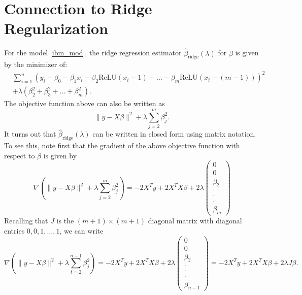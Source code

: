 \documentclass{scrartcl}
\newcommand{\relu}{{\text{ReLU}}}
\newcommand{\ridge}{{\hat{\beta}_{\text{ridge}}(\lambda)}}
\begin{document}
\section{Connection to Ridge Regularization}
For the model \eqref{ibm_mod}, the ridge regression estimator $\ridge$
for $\beta$ is given by the minimizer of: 
\begin{equation}\label{ridge_est}
  \begin{split}
 & \sum_{i=1}^n \left(y_i - \beta_0 - \beta_1 x_i - \beta_2
    \relu(x_i-1) - \dots - \beta_{m} \relu(x_i-(m-1)) \right)^2 \\ &+
  \lambda \left(\beta_2^2 + \beta_3^2 + \dots + \beta_{m}^2
    \right). 
  \end{split}  
\end{equation}
The objective function above can also be written as 
\begin{equation*}
  \|y - X \beta\|^2 + \lambda \sum_{j=2}^{m} \beta_j^2. 
\end{equation*}
It turns out that $\ridge$ can be written in closed form using matrix
notation. To see this, note first that the gradient of the above
objective function with respect to $\beta$ is given by 
\begin{equation*}
\nabla \left(  \|y - X \beta\|^2 + \lambda \sum_{j=2}^{m} \beta_j^2
\right) =  -2 X^T y + 2 X^T X \beta + 2 \lambda 
  \begin{pmatrix}
    0 \\ 0 \\ \beta_2 \\ \cdot \\ \cdot \\ \cdot \\ \beta_{m}
  \end{pmatrix}
\end{equation*}
Recalling that $J$ is the $(m+1) \times (m+1)$  diagonal matrix with
diagonal entries $0, 0, 1, \dots, 1$, we can write 
\begin{equation*}
\nabla \left(  \|y - X \beta\|^2 + \lambda \sum_{t=2}^{n-1} \beta_j^2
\right) =  -2 X^T y + 2 X^T X \beta + 2 \lambda 
  \begin{pmatrix}
    0 \\ 0 \\ \beta_2 \\ \cdot \\ \cdot \\ \cdot \\ \beta_{n-1}
  \end{pmatrix} = -2 X^T y + 2 X^T X \beta + 2 \lambda J \beta. 
\end{equation*}
\end{document}

